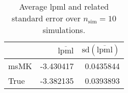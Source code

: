 \begin{table}[H]

\caption{Average lpml and related standard error over $n_{\text{sim}} = 10$ simulations.}
\centering
\begin{tabular}[t]{lrr}
\toprule
  & $\overbar{\text{lpml}}$ & $\text{sd}(\overbar{\text{lpml}})$\\
\midrule
msMK & -3.430417 & 0.0435844\\
True & -3.382135 & 0.0393893\\
\bottomrule
\end{tabular}
\end{table}